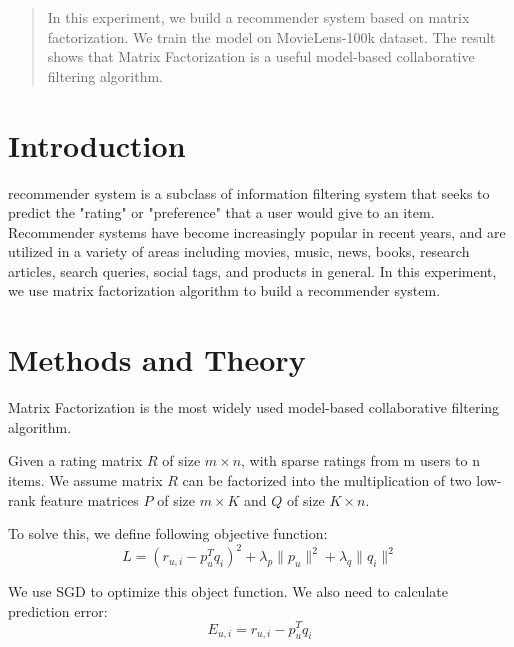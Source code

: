 \documentclass[journal, a4paper]{IEEEtran}
\begin{document}
\begin{abstract}
    In this experiment, we build a recommender system based on matrix factorization. We train the model on MovieLens-100k dataset. The result shows that Matrix Factorization is a useful model-based collaborative filtering algorithm.
\end{abstract}

\section{Introduction}
    recommender system  is a subclass of information filtering system that seeks to predict the "rating" or "preference" that a user would give to an item. Recommender systems have become increasingly popular in recent years, and are utilized in a variety of areas including movies, music, news, books, research articles, search queries, social tags, and products in general. In this experiment, we use matrix factorization algorithm to build a recommender system. 

\section{Methods and Theory}

    Matrix Factorization is the most widely used model-based collaborative filtering algorithm.

    Given a rating matrix $R$ of size $m \times n$, with sparse ratings from m users to n items. We assume matrix $R$ can be factorized into the multiplication of two low-rank feature matrices $P$ of size $m \times K$ and $Q$ of size $K \times n$. 

    To solve this, we define following objective function:
    \begin{equation}
        L=(r_{u,i}-p_u^Tq_i)^2+\lambda_p\|p_u\|^2+\lambda_q\|q_i\|^2
    \end{equation}

    We use SGD to optimize this object function. We also need to calculate prediction error:
    \begin{equation}
        E_{u,i}=r_{u,i}-p_u^Tq_i
    \end{equation}
\end{document}
